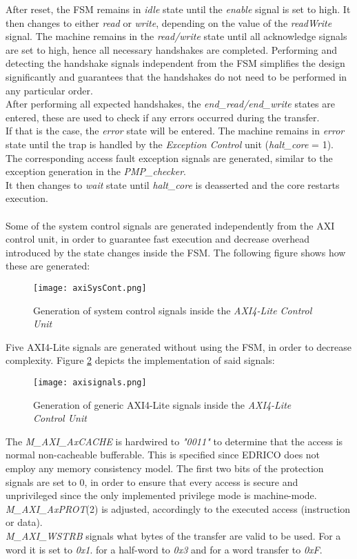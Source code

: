 After reset, the \ac{FSM} remains in \textit{idle} state until the \textit{enable} signal is set to high. It then changes to either \textit{read} or \textit{write}, depending on the value of the \textit{readWrite} signal. The machine remains in the \textit{read/write} state until all acknowledge signals are set to high, hence all necessary handshakes are completed. Performing and detecting the handshake signals independent from the \ac{FSM} simplifies the design significantly and guarantees that the handshakes do not need to be performed in any particular order.\\
After performing all expected handshakes, the \textit{end\_read/end\_write} states are entered, these are used to check if any errors occurred during the transfer.\\
If that is the case, the \textit{error} state will be entered. The machine remains in \textit{error} state until the trap is handled by the \textit{Exception Control} unit (\textit{halt\_core} = 1). The corresponding access fault exception signals are generated, similar to the exception generation in the \textit{PMP\_checker}.\\
It then changes to \textit{wait} state until \textit{halt\_core} is deasserted and the core restarts execution. \\
\\
Some of the system control signals are generated independently from the \ac{AXI} control unit, in order to guarantee fast execution and decrease overhead introduced by the state changes inside the \ac{FSM}. The following figure shows how these are generated:

\begin{figure}[H]
	\centering
	\texttt{[image: axiSysCont.png]}
	\caption{Generation of system control signals inside the \textit{AXI4-Lite Control Unit}}
	\label{fig:axiSysCont}
\end{figure}

Five \ac{AXI4-Lite} signals are generated without using the FSM, in order to decrease complexity. Figure \ref{fig:axisignals} depicts the implementation of said signals:

\begin{figure}[H]
	\centering
	\texttt{[image: axisignals.png]}
	\caption{Generation of generic \ac{AXI4-Lite} signals inside the \textit{AXI4-Lite Control Unit}}
	\label{fig:axisignals}
\end{figure}

The\textit{ M\_AXI\_AxCACHE} is hardwired to \textit{"0011"} to determine that the access is normal non-cacheable bufferable. This is specified since \ac{EDRICO} does not employ any memory consistency model. The first two bits of the protection signals are set to 0, in order to ensure that every access is secure and unprivileged since the only implemented privilege mode is machine-mode. \textit{M\_AXI\_AxPROT}(2) is adjusted, accordingly to the executed access (instruction or data).\\
\textit{M\_AXI\_WSTRB} signals what bytes of the transfer are valid to be used. For a word it is set to \textit{0x1}. for a half-word to \textit{0x3} and for a word transfer to \textit{0xF}.


